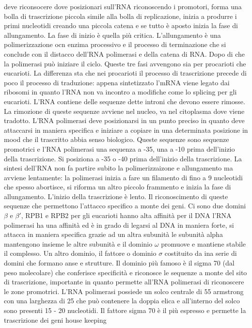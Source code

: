 deve riconsocere dove posizionari sull'RNA riconoscendo i promotori, forma una bolla di trascrizione piccola simile alla bolla di replicazione, inizia a produrre i primi nucleotidi 
creando una piccola catena e se tutto \`e aposto inizia la fase di allungamento. La fase di inizio \`e quella pi\`u critica. L'allungamento \`e una polimerizzazione ocn enzima processivo
e il processo di terminazione che si conclude con il distacco dell'RNA polimerasi e della catena di RNA. Dopo di che la polimerasi pu\`o iniziare il ciclo. Queste tre fasi avvengono sia
per procarioti che eucarioti. La differenza sta che nei procarioti il processo di trascrizione precede di poco il processo di traduzione: appena sintetizzato l'mRNA viene legato dai 
ribosomi in quanto l'RNA non va incontro a modifiche come lo splicing per gli eucarioti. L'RNA contiene delle sequenze dette introni che devono essere rimosse. La rimozione di queste
sequenze avviene nel nucleo, va nel citoplasma dove viene tradotto. L'RNA polimerasi deve posizionarsi in un punto preciso in quanto deve attaccarsi in maniera specifica e iniziare a 
copiare in una determinata posizione in mood che il trascritto abbia senso biologico. Queste sequenze sono sequenze promotrici e l'RNA polimerasi una sequenza a -35, una a -10 prima 
dell'inizio della trascrizione. Si posiziona a -35 o -40 prima dell'inizio della trascrizione. La sintesi dell'RNA non fa partire subito la polimerizzaizone e allungamento ma avviene
lentamente: la polimerasi inizia a fare un filamento di fino a 9 nucleotidi che spesso abortisce, si riforma un altro piccolo frammento e inizia la fase di allungamento. L'inizio della
trascrizione \`e lento. Il riconoscimento di queste sequenze che permettono l'attacco specifico a monte dei geni. Ci sono due domini $\beta$ e $\beta'$, RPB1 e RPB2 per gli eucarioti 
hanno alta affinit\`a per il DNA l'RNA polimerasi ha una affinit\`a ed \`e in grado di legarsi al DNA in maniera forte, si attacca in maniera specifica grazie ad un altra subunit\`a 
le subunit\`a alpha mantengono insieme le altre subunit\`a e il dominio $\omega$ promuove e mantiene stabile il complesso. Un altro dominio, il fattore o dominio $\sigma$ costituito da
ina serie di domini che formano anse e strutture. Il dominio pi\`u famoso \`e il sigma 70 (dal peso molecolare) che conferisce specificit\`a e riconosce le sequenze a monte del sito di 
trascrizione, importante in quanto permette all'RNA polimerasi di riconoscere le zone promotrici. L'RNA polimerasi possiede un solco centrale di 55 armstrong con una larghezza di 25 che 
pu\`o contenere la doppia elica e all'interno del solco sono presenti 15 - 20 nucleotidi. Il fattore sigma 70 \`e il pi\`u espresso e permette la trascrizione dei geni house keeping
